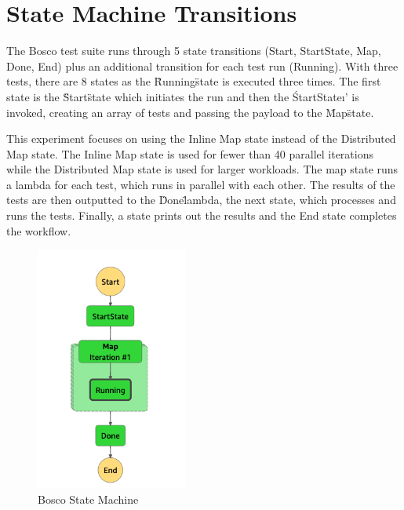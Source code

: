 \documentclass[12pt,a4paper,titlepage]{report}
\begin{document}
\section{State Machine Transitions}

The Bosco test suite runs through 5 state transitions (Start, StartState, Map, Done, End) plus an additional transition for each test run (Running). With three tests, there are 8 states as the \"Running\" state is executed three times. The first state is the \"Start\" state which initiates the run and then the \'StartState\i' is invoked, creating an array of tests and passing the payload to the \"Map\" state.

This experiment focuses on using the Inline Map state instead of the Distributed Map state. The Inline Map state is used for fewer than 40 parallel iterations while the Distributed Map state is used for larger workloads. The map state runs a lambda for each test, which runs in parallel with each other. The results of the tests are then outputted to the \"Done\" lambda, the next state, which processes and runs the tests. Finally, a state prints out the results and the End state completes the workflow.

\begin{figure}[H]
 \centering
 \includegraphics[width=5cm]{./diagrams/step_function}
 \caption{Bosco State Machine}
\end{figure}
\end{document}
